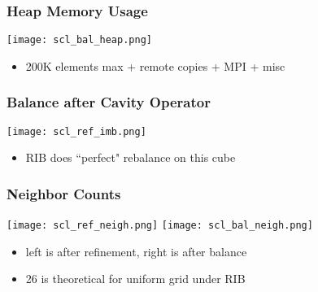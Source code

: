 \documentclass{beamer}
\begin{document}
\begin{frame}
\frametitle{Heap Memory Usage}
\begin{center}
\texttt{[image: scl\_bal\_heap.png]}
\end{center}
\begin{itemize}
\item 200K elements max + remote copies + MPI + misc
\end{itemize}
\end{frame}

\begin{frame}
\frametitle{Balance after Cavity Operator}
\begin{center}
\texttt{[image: scl\_ref\_imb.png]}
\end{center}
\begin{itemize}
\item RIB does ``perfect" rebalance on this cube
\end{itemize}
\end{frame}

\begin{frame}
\frametitle{Neighbor Counts}
\begin{center}
\texttt{[image: scl\_ref\_neigh.png]}
\texttt{[image: scl\_bal\_neigh.png]}
\end{center}
\begin{itemize}
\item left is after refinement, right is after balance
\item 26 is theoretical for uniform grid under RIB
\end{itemize}
\end{frame}

\end{document}
